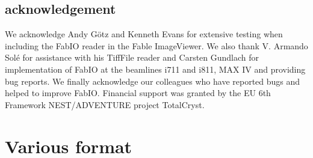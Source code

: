 \documentclass{iucr}
\begin{document}
\subsection{acknowledgement}
We acknowledge Andy G\"otz and Kenneth Evans for extensive testing when including
the FabIO reader in the Fable ImageViewer.
We also thank V. Armando Sol\'e for assistance with his TiffFile reader and Carsten Gundlach
for implementation of FabIO at the beamlines i711 and i811, MAX IV and providing bug reports.
We finally acknowledge our colleagues who have reported bugs and helped to
improve FabIO.
Financial support was granted by the EU 6th Framework NEST/ADVENTURE project
TotalCryst.





\appendix
\section{Various format}
\onecolumn
\end{document}
